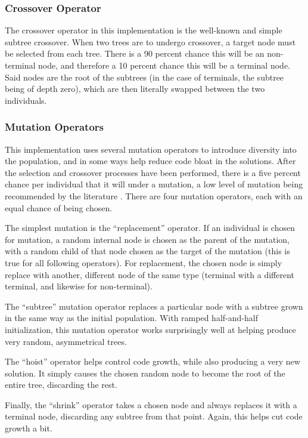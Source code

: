 \documentclass{acm_proc_article-sp}
\begin{document}
\subsubsection{Crossover Operator}
The crossover operator in this implementation is the well-known and
simple subtree crossover. When two trees are to undergo crossover, a
target node must be selected from each tree. There is a 90 percent
chance this will be an non-terminal node, and therefore a 10 percent
chance this will be a terminal node. Said nodes are the root of the
subtrees (in the case of terminals, the subtree being of depth zero),
which are then literally swapped between the two individuals.

\subsubsection{Mutation Operators}
This implementation uses several mutation operators to introduce
diversity into the population, and in some ways help reduce code bloat
in the solutions. After the selection and crossover processes have
been performed, there is a five percent chance per individual that it
will under a mutation, a low level of mutation being recommended by
the literature \cite{Poli:Field}. There are four mutation operators, each
with an equal chance of being chosen.

The simplest mutation is the ``replacement'' operator. If an
individual is chosen for mutation, a random internal node is chosen as
the parent of the mutation, with a random child of that node chosen as
the target of the mutation (this is true for all following
operators). For replacement, the chosen node is simply replace with
another, different node of the same type (terminal with a different
terminal, and likewise for non-terminal).

The ``subtree'' mutation operator replaces a particular node with a
subtree grown in the same way as the initial population. With ramped
half-and-half initialization, this mutation operator works
surprisingly well at helping produce very random, asymmetrical trees.

The ``hoist'' operator helps control code growth, while also producing
a very new solution. It simply causes the chosen random node to become
the root of the entire tree, discarding the rest.

Finally, the ``shrink'' operator takes a chosen node and always
replaces it with a terminal node, discarding any subtree from that
point. Again, this helps cut code growth a bit.
\end{document}
